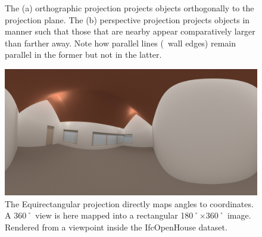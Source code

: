 \begin{figure}[tb]
\centering
{}
\qquad
{}
\caption[Orthographic and perspective projections]{The (a) orthographic projection projects objects orthogonally to the projection plane.
The (b) perspective projection projects objects in manner such that those that are nearby appear comparatively larger than farther away. 
Note how parallel lines (\eg\ wall edges) remain parallel in the former but not in the latter.}
\label{fig:scheduling}
\end{figure}

\begin{figure}[tb]
\centering
\includegraphics[width=\linewidth]{figs/ioh-equiangle}
\caption[Equirectangular projection]{The Equirectangular projection directly maps angles to coordinates.
A 360˚ view is here mapped into a rectangular 180˚$\times$360˚ image.
Rendered from a viewpoint inside the IfcOpenHouse dataset\protect\footnotemark.}
\label{fig:ioh-equiangle}
\end{figure}

